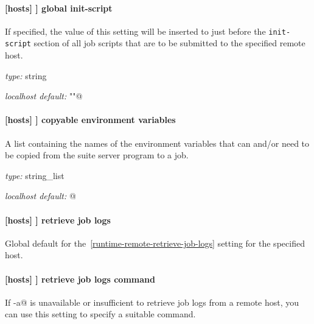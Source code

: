 \paragraph[global init-script]{[hosts] \textrightarrow [[HOST]] \textrightarrow global init-script }
\label{GlobalInitScript}

If specified, the value of this setting will be inserted to just before the
\lstinline=init-script= section of all job scripts that are to be
submitted to the specified remote host.

\begin{myitemize}
\item {\em type:} string
\item {\em localhost default:} \lstinline@""@
\end{myitemize}

\paragraph[copyable environment variables]{[hosts] \textrightarrow [[HOST]] \textrightarrow copyable environment variables }

A list containing the names of the environment variables that can and/or need
to be copied from the suite server program to a job.

\begin{myitemize}
\item {\em type:} string\_list
\item {\em localhost default:} \lstinline@[]@
\end{myitemize}

\paragraph[retrieve job logs]{[hosts] \textrightarrow [[HOST]] \textrightarrow retrieve job logs}

Global default for the~\ref{runtime-remote-retrieve-job-logs} setting for the
specified host.

\paragraph[retrieve job logs command]{[hosts] \textrightarrow [[HOST]] \textrightarrow retrieve job logs command}

If \lstinline@rsync -a@ is unavailable or insufficient to retrieve job logs
from a remote host, you can use this setting to specify a suitable command.

